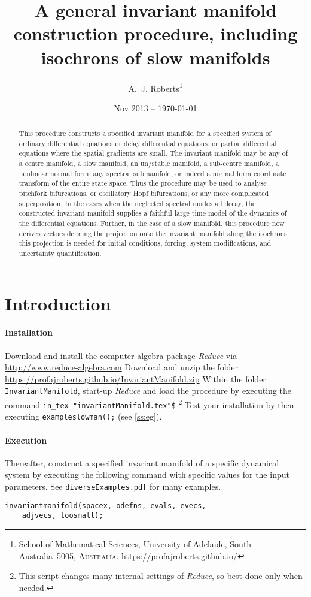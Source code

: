\documentclass[11pt,a5paper]{article}
\title{A general invariant manifold construction procedure,
including isochrons of slow manifolds}
\author{A.~J. Roberts\thanks{School of Mathematical
Sciences, University of Adelaide, South Australia~5005,
\textsc{Australia}. \url{https://profajroberts.github.io/}}}
\date{Nov 2013 -- \today}
\begin{document}
\sloppy

\maketitle

\begin{abstract}
This procedure constructs a specified invariant manifold for
a specified system of ordinary differential equations or
delay differential equations, or partial differential
equations where the spatial gradients are small. The
invariant manifold may be any of a centre manifold, a slow
manifold, an un/stable manifold, a sub-centre manifold, a
nonlinear normal form, any spectral submanifold, or indeed a
normal form coordinate transform of the entire state space.
Thus the procedure may be used to analyse pitchfork
bifurcations, or oscillatory Hopf bifurcations, or any more
complicated superposition. In the cases when the neglected
spectral modes all decay, the constructed invariant manifold
supplies a faithful large time model of the dynamics of the
differential equations. Further, in the case of a slow
manifold, this procedure now derives vectors defining the
projection onto the invariant manifold along the isochrons:
this projection is needed for initial conditions, forcing,
system modifications, and uncertainty quantification.
\end{abstract}

\tableofcontents



\section{Introduction}

\paragraph{Installation}
Download and install the computer algebra package
\emph{Reduce} via \url{http://www.reduce-algebra.com}\quad
Download and unzip the folder
\url{https://profajroberts.github.io/InvariantManifold.zip}
\quad Within the folder \verb|InvariantManifold|, start-up
\emph{Reduce} and load the procedure by executing the
command \verb|in_tex "invariantManifold.tex"$|
\footnote{This script changes many internal settings of
\emph{Reduce}, so best done only when needed.} Test your
installation by then executing \verb|exampleslowman();|
\quad(see \cref{ss:eg}).

\paragraph{Execution}
Thereafter, construct a specified invariant manifold of a
specific dynamical system by executing the following command
with specific values for the input parameters.  See
\verb|diverseExamples.pdf| for many examples.
\begin{verbatim}
invariantmanifold(spacex, odefns, evals, evecs, 
    adjvecs, toosmall);
\end{verbatim}
\end{document}
